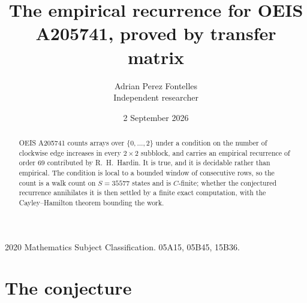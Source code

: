 \documentclass[11pt,a4paper]{article}
\title{The empirical recurrence for OEIS A205741, proved by transfer matrix}
\author{Adrian Perez Fontelles\\ \small Independent researcher}
\date{2 September 2026}
\theoremstyle{plain}
\theoremstyle{definition}
\begin{document}
\maketitle

\begin{abstract}
OEIS A205741 counts arrays over $\{0,\dots,2\}$ under a condition on the number of clockwise edge increases
in every $2\times2$ subblock, and carries an empirical recurrence of order $69$ contributed by
R.~H.~Hardin. It is true, and it is decidable rather than empirical. The condition is local to
a bounded window of consecutive rows, so the count is a walk count on $S=35577$ states and is
$C$-finite; whether the conjectured recurrence annihilates it is then settled by a finite exact
computation, with the Cayley--Hamilton theorem bounding the work.
\end{abstract}

\noindent\small 2020 Mathematics Subject Classification. 05A15, 05B45, 15B36.\normalsize

\section{The conjecture}
\end{document}
